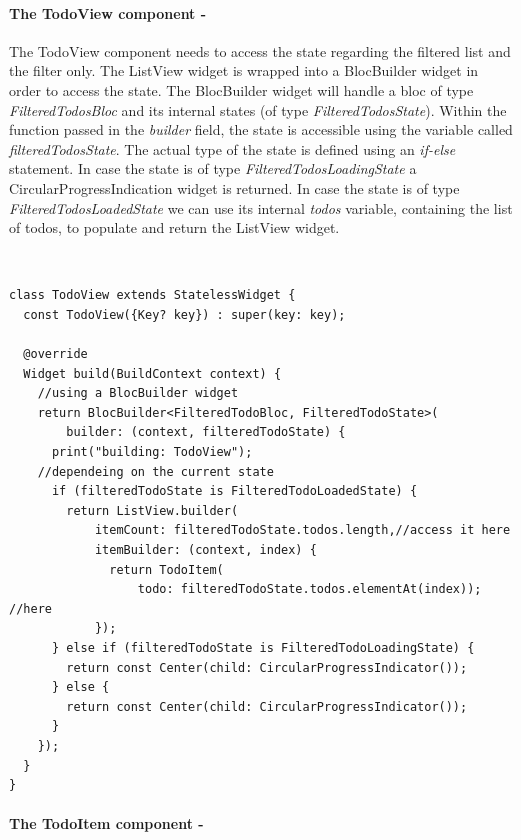 \paragraph{The TodoView component - }
\label{subpar:todo_app_bloc_core_state}

The TodoView component needs to access the state regarding the filtered list and the filter only. The ListView widget is wrapped into a BlocBuilder widget in order to access the state. The BlocBuilder widget will handle a bloc of type \textit{FilteredTodosBloc }and its internal states (of type \textit{FilteredTodosState}). Within the function passed in the \textit{builder} field, the state is accessible using the variable called \textit{filteredTodosState}. The actual type of the state is defined using an \textit{if-else} statement. In case the state is of type \textit{FilteredTodosLoadingState} a CircularProgressIndication widget is returned. In case the state is of type \textit{FilteredTodosLoadedState} we can use its internal \textit{todos} variable, containing the list of todos, to populate and return the ListView widget.\begin{code}
\mbox{}\\
 \mbox{}
\label{code:2.14}
\begin{verbatim}
class TodoView extends StatelessWidget {
  const TodoView({Key? key}) : super(key: key);

  @override
  Widget build(BuildContext context) {
    //using a BlocBuilder widget
    return BlocBuilder<FilteredTodoBloc, FilteredTodoState>(
        builder: (context, filteredTodoState) {
      print("building: TodoView");
	//dependeing on the current state
      if (filteredTodoState is FilteredTodoLoadedState) {
        return ListView.builder(
            itemCount: filteredTodoState.todos.length,//access it here
            itemBuilder: (context, index) {
              return TodoItem(
                  todo: filteredTodoState.todos.elementAt(index)); //here
            });
      } else if (filteredTodoState is FilteredTodoLoadingState) {
        return const Center(child: CircularProgressIndicator());
      } else {
        return const Center(child: CircularProgressIndicator());
      }
    });
  }
}
\end{verbatim}
\mbox{}
\end{code}

\paragraph{The TodoItem component - }
\label{subpar:todo_app_bloc_core_state}

